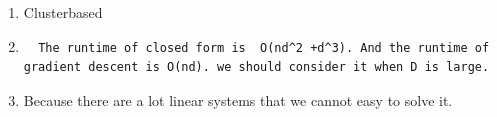 \documentclass{article}
\begin{document}
\begin{enumerate}
\item  Clusterbased
\item
\begin{verbatim}
  The runtime of closed form is  O(nd^2 +d^3). And the runtime of gradient descent is O(nd). we should consider it when D is large. 
  \end{verbatim}
\item Because there are a lot linear systems that we cannot easy to solve it.   

\end{enumerate}
\end{document}
